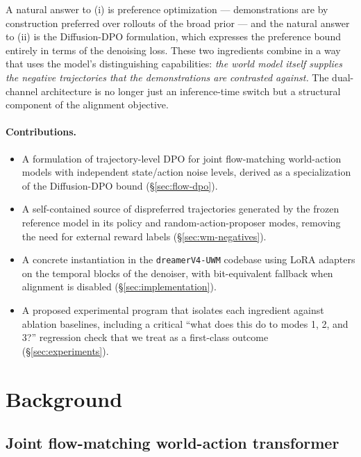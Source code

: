 \documentclass[11pt]{article}
\begin{document}
A natural answer to (i) is preference optimization --- demonstrations are by construction preferred over rollouts of the broad prior --- and the natural answer to (ii) is the Diffusion-DPO formulation, which expresses the preference bound entirely in terms of the denoising loss. These two ingredients combine in a way that uses the model's distinguishing capabilities: \emph{the world model itself supplies the negative trajectories that the demonstrations are contrasted against.} The dual-channel architecture is no longer just an inference-time switch but a structural component of the alignment objective.

\paragraph{Contributions.}
\begin{itemize}
    \item A formulation of trajectory-level DPO for joint flow-matching world-action models with independent state/action noise levels, derived as a specialization of the Diffusion-DPO bound (\S\ref{sec:flow-dpo}).
    \item A self-contained source of dispreferred trajectories generated by the frozen reference model in its policy and random-action-proposer modes, removing the need for external reward labels (\S\ref{sec:wm-negatives}).
    \item A concrete instantiation in the \texttt{dreamerV4-UWM} codebase using LoRA adapters on the temporal blocks of the denoiser, with bit-equivalent fallback when alignment is disabled (\S\ref{sec:implementation}).
    \item A proposed experimental program that isolates each ingredient against ablation baselines, including a critical ``what does this do to modes 1, 2, and 3?'' regression check that we treat as a first-class outcome (\S\ref{sec:experiments}).
\end{itemize}

\section{Background}
\label{sec:background}

\subsection{Joint flow-matching world-action transformer}
\label{sec:bg-uwm}
\end{document}
